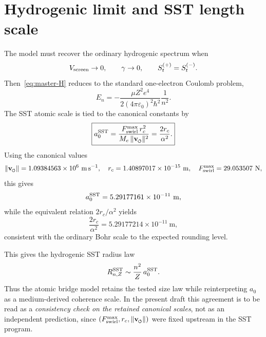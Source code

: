 \documentclass[11pt,a4paper]{article}
\newcommand{\swirlarrow}{\mathchoice{\mkern-2mu\scriptstyle\boldsymbol{\circlearrowleft}}{\mkern-2mu\scriptstyle\boldsymbol{\circlearrowleft}}{\mkern-2mu\scriptscriptstyle\boldsymbol{\circlearrowleft}}{\mkern-2mu\scriptscriptstyle\boldsymbol{\circlearrowleft}}}
\newcommand{\vswirl}{\mathbf{v}_{\swirlarrow}}
\newcommand{\rc}{r_c}
\begin{document}
\section{Hydrogenic limit and SST length scale}
The model must recover the ordinary hydrogenic spectrum when
\begin{equation}
V_{\rm screen}\to 0,
\qquad
\gamma\to 0,
\qquad
S_t^{(+)}=S_t^{(-)}.
\end{equation}
Then~\eqref{eq:master-H} reduces to the standard one-electron Coulomb problem,
\begin{equation}
\label{eq:En}
E_n=-\frac{\mu Z^2 e^4}{2(4\pi\varepsilon_0)^2\hbar^2}\frac{1}{n^2}.
\end{equation}
The SST atomic scale is tied to the canonical constants by
\begin{equation}
\label{eq:a0-sst}
\boxed{
a_0^{\rm SST}
=
\frac{F_{\rm swirl}^{\max}\,\rc^2}{M_e\,\lVert\vswirl\rVert^2}
=
\frac{2\rc}{\alpha^2}.
}
\end{equation}
Using the canonical values
\begin{equation}
\lVert\vswirl\rVert = 1.09384563\times 10^6\ \mathrm{m\,s^{-1}},
\quad
\rc = 1.40897017\times 10^{-15}\ \mathrm{m},
\quad
F_{\rm swirl}^{\max}=29.053507\ \mathrm{N},
\end{equation}
this gives
\begin{equation}
\label{eq:a0-num}
a_0^{\rm SST}
=
5.29177161\times 10^{-11}\ \mathrm{m},
\end{equation}
while the equivalent relation $2\rc/\alpha^2$ yields
\begin{equation}
\label{eq:a0-num2}
\frac{2\rc}{\alpha^2}=5.29177214\times 10^{-11}\ \mathrm{m},
\end{equation}
consistent with the ordinary Bohr scale to the expected rounding level.

This gives the hydrogenic SST radius law
\begin{equation}
\label{eq:RnZ}
R_{n,Z}^{\rm SST}\sim \frac{n^2}{Z}\,a_0^{\rm SST}.
\end{equation}
Thus the atomic bridge model retains the tested size law while reinterpreting $a_0$ as a medium-derived coherence scale. In the present draft this agreement is to be read as a \emph{consistency check on the retained canonical scales}, not as an independent prediction, since $(F_{\rm swirl}^{\max},\rc,\lVert\vswirl\rVert)$ were fixed upstream in the SST program.
\end{document}
